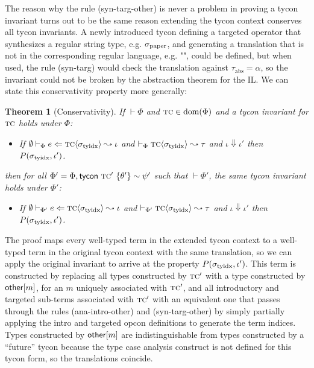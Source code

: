 \documentclass[10pt,preprint]{sigplanconf}
\newtheorem{theorem}{Theorem}
\newenvironment{proof-sketch}{\noindent{\emph{Proof Sketch.}}}{\qed}
\begin{document}
The reason why the rule (syn-targ-other) is never a problem in proving a tycon invariant turns out to be the same reason extending the tycon context conserves all tycon invariants. A newly introduced tycon defining a targeted operator that synthesizes a regular string type, e.g. $\sigma_\text{paper}$, and generating a translation that is not in the corresponding regular language, e.g. $\texttt{""}$, could be defined, but when used, the rule (syn-targ) would check the translation against $\tau_\text{abs}=\alpha$, so the invariant could not be broken by the abstraction theorem for the IL. %
 We can state this conservativity property more generally:

\begin{theorem}[Conservativity] If $\vdash \Phi$ and $\textsc{tc} \in \text{dom}(\Phi)$ and a tycon invariant for $\textsc{tc}$ holds under $\Phi$: \begin{itemize}
\item If $\emptyset \vdash_{\Phi} e \Leftarrow {\textsc{tc}}\langle\sigma_\text{tyidx}\rangle \leadsto \iota$ and $\vdash_\Phi {{\textsc{tc}}\langle\sigma_\text{tyidx}\rangle} \leadsto \tau$ and $\iota \Downarrow \iota'$ then $P(\sigma_\text{tyidx}, \iota')$.
\end{itemize} then for all $\Phi' = \Phi, {\sf tycon}~\textsc{tc}' ~\{\theta'\} \sim \psi'$ such that $\vdash \Phi'$, the same tycon invariant holds under $\Phi'$: \begin{itemize}
\item If $\emptyset \vdash_{\Phi'} e \Leftarrow {\textsc{tc}}\langle\sigma_\text{tyidx}\rangle \leadsto \iota$ and $\vdash_{\Phi'}{{\textsc{tc}}\langle\sigma_\text{tyidx}\rangle}\leadsto{\tau}$ and $\iota \Downarrow \iota'$ then $P(\sigma_\text{tyidx}, \iota')$.
\end{itemize}
\end{theorem}
\begin{proof-sketch}
The proof maps every well-typed term in the extended tycon context to a well-typed term in the original tycon context with the same translation, so we can apply the original invariant to arrive at the property $P(\sigma_\text{tyidx}, \iota')$. This term is constructed by replacing all types constructed by $\textsc{tc}'$ with a type constructed by ${\sf other}[m]$, for an $m$ uniquely associated with $\textsc{tc}'$, and all introductory and targeted sub-terms associated with $\textsc{tc}'$ with an equivalent one that passes through the rules (ana-intro-other) and (syn-targ-other) by simply partially applying the intro and targeted opcon definitions to generate the term indices. Types constructed by ${\sf other}[m]$ are indistinguishable from types constructed by a ``future'' tycon because the type case analysis construct is not defined for this tycon form, so the translations coincide.\end{proof-sketch}
\end{document}
